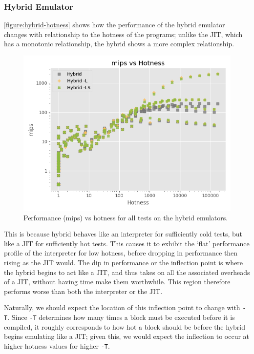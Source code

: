 \subsubsection{Hybrid Emulator}
\label{section:perf-hybrid}

\autoref{figure:hybrid-hotness} shows how the performance of the hybrid emulator changes with relationship to the hotness of the programs; unlike the JIT, which has a monotonic relationship, the hybrid shows a more complex relationship.

\begin{figure}[H]
    \centering
    \includegraphics[scale=0.75]{output/graphs/scatter/hybrid/hotness.png}
    \caption{Performance (mips) vs hotness for all tests on the hybrid emulators.}
    \label{figure:hybrid-hotness}
\end{figure}

This is because hybrid behaves like an interpreter for sufficiently cold tests, but like a JIT for sufficiently hot tests. This causes it to exhibit the `flat' performance profile of the interpreter for low hotness, before dropping in performance then rising as the JIT would. The dip in performance or the inflection point is where the hybrid begins to act like a JIT, and thus takes on all the associated overheads of a JIT, without having time make them worthwhile. This region therefore performs worse than both the interpreter or the JIT.

Naturally, we should expect the location of this inflection point to change with \texttt{-T}. Since \texttt{-T} determines how many times a block must be executed before it is compiled, it roughly corresponds to how hot a block should be before the hybrid begins emulating like a JIT; given this, we would expect the inflection to occur at higher hotness values for higher \texttt{-T}.

